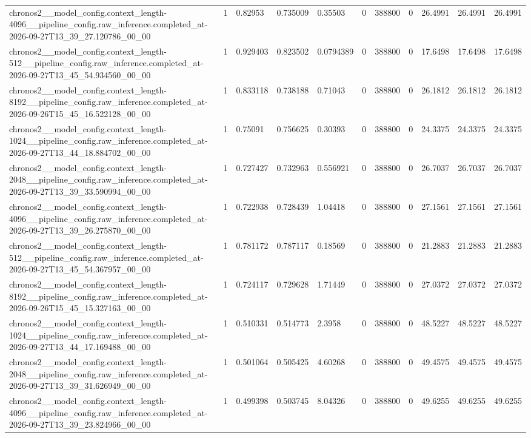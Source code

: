\begin{tabular}{lllllllllll}
chronos2\_\_model\_config.context\_length-4096\_\_pipeline\_config.raw\_inference.completed\_at-2026-09-27T13\_39\_27.120786\_00\_00 & 1 & 0.82953 & 0.735009 & 0.35503 & 0 & 388800 & 0 & 26.4991 & 26.4991 & 26.4991 \\
chronos2\_\_model\_config.context\_length-512\_\_pipeline\_config.raw\_inference.completed\_at-2026-09-27T13\_45\_54.934560\_00\_00 & 1 & 0.929403 & 0.823502 & 0.0794389 & 0 & 388800 & 0 & 17.6498 & 17.6498 & 17.6498 \\
chronos2\_\_model\_config.context\_length-8192\_\_pipeline\_config.raw\_inference.completed\_at-2026-09-26T15\_45\_16.522128\_00\_00 & 1 & 0.833118 & 0.738188 & 0.71043 & 0 & 388800 & 0 & 26.1812 & 26.1812 & 26.1812 \\
chronos2\_\_model\_config.context\_length-1024\_\_pipeline\_config.raw\_inference.completed\_at-2026-09-27T13\_44\_18.884702\_00\_00 & 1 & 0.75091 & 0.756625 & 0.30393 & 0 & 388800 & 0 & 24.3375 & 24.3375 & 24.3375 \\
chronos2\_\_model\_config.context\_length-2048\_\_pipeline\_config.raw\_inference.completed\_at-2026-09-27T13\_39\_33.590994\_00\_00 & 1 & 0.727427 & 0.732963 & 0.556921 & 0 & 388800 & 0 & 26.7037 & 26.7037 & 26.7037 \\
chronos2\_\_model\_config.context\_length-4096\_\_pipeline\_config.raw\_inference.completed\_at-2026-09-27T13\_39\_26.275870\_00\_00 & 1 & 0.722938 & 0.728439 & 1.04418 & 0 & 388800 & 0 & 27.1561 & 27.1561 & 27.1561 \\
chronos2\_\_model\_config.context\_length-512\_\_pipeline\_config.raw\_inference.completed\_at-2026-09-27T13\_45\_54.367957\_00\_00 & 1 & 0.781172 & 0.787117 & 0.18569 & 0 & 388800 & 0 & 21.2883 & 21.2883 & 21.2883 \\
chronos2\_\_model\_config.context\_length-8192\_\_pipeline\_config.raw\_inference.completed\_at-2026-09-26T15\_45\_15.327163\_00\_00 & 1 & 0.724117 & 0.729628 & 1.71449 & 0 & 388800 & 0 & 27.0372 & 27.0372 & 27.0372 \\
chronos2\_\_model\_config.context\_length-1024\_\_pipeline\_config.raw\_inference.completed\_at-2026-09-27T13\_44\_17.169488\_00\_00 & 1 & 0.510331 & 0.514773 & 2.3958 & 0 & 388800 & 0 & 48.5227 & 48.5227 & 48.5227 \\
chronos2\_\_model\_config.context\_length-2048\_\_pipeline\_config.raw\_inference.completed\_at-2026-09-27T13\_39\_31.626949\_00\_00 & 1 & 0.501064 & 0.505425 & 4.60268 & 0 & 388800 & 0 & 49.4575 & 49.4575 & 49.4575 \\
chronos2\_\_model\_config.context\_length-4096\_\_pipeline\_config.raw\_inference.completed\_at-2026-09-27T13\_39\_23.824966\_00\_00 & 1 & 0.499398 & 0.503745 & 8.04326 & 0 & 388800 & 0 & 49.6255 & 49.6255 & 49.6255 \\

\end{tabular}
